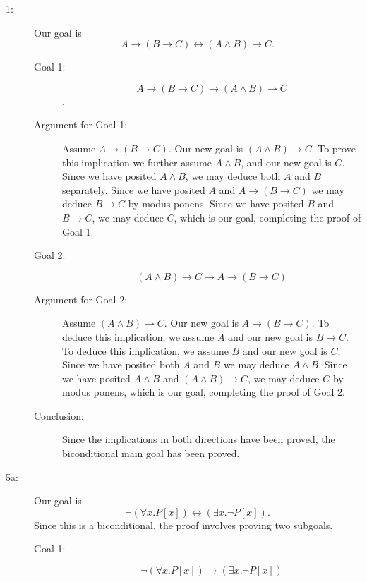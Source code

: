 \documentclass[12pt]{book}
\begin{document}
\begin{description}

\item[1:] Our goal is $$A\rightarrow (B \rightarrow C) \leftrightarrow (A
\wedge B) \rightarrow C.$$  

\begin{description} 

\item[Goal 1:]  $$A\rightarrow (B \rightarrow C) \rightarrow (A
\wedge B) \rightarrow C$$.

\item[Argument for Goal 1:]

Assume $A\rightarrow (B \rightarrow C)$.  Our new goal is $(A \wedge
B) \rightarrow C$.  To prove this implication we further assume
$A\wedge B$, and our new goal is $C$.  Since we have posited $A \wedge
B$, we may deduce both $A$ and $B$ separately.  Since we have posited
$A$ and $A\rightarrow (B \rightarrow C)$ we may deduce $B \rightarrow
C$ by modus ponens.  Since we have posited $B$ and $B \rightarrow C$,
we may deduce $C$, which is our goal, completing the proof of Goal 1.

\item[Goal 2:]  $$(A\wedge B) \rightarrow C \rightarrow A\rightarrow (B \rightarrow C)$$

\item[Argument for Goal 2:] Assume $(A\wedge B) \rightarrow C$.  Our
new goal is $A\rightarrow (B \rightarrow C)$.  To deduce this
implication, we assume $A$ and our new goal is $B\rightarrow C$.  To
deduce this implication, we assume $B$ and our new goal is $C$.  Since
we have posited both $A$ and $B$ we may deduce $A \wedge B$.  Since we
have posited $A \wedge B$ and $(A\wedge B) \rightarrow C$, we may
deduce $C$ by modus ponens, which is our goal, completing the proof of
Goal 2.

\item[Conclusion:] Since the implications in both directions have been
proved, the biconditional main goal has been proved.

\end{description}
\newpage
\item[5a:] Our goal is $$\neg (\forall x.P[x]) \leftrightarrow (\exists x.\neg
P[x]).$$ Since this is a biconditional, the proof involves proving two
subgoals.

\begin{description}

\item[Goal 1:]  $$\neg (\forall x.P[x]) \rightarrow (\exists x.\neg
P[x])$$


\end{description}
\end{description}
\end{document}
